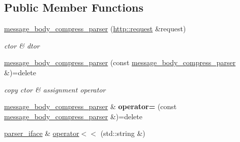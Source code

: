 \subsection*{Public Member Functions}
\begin{DoxyCompactItemize}
\item 
\mbox{\label{classnetflex_1_1parsing_1_1message__body__compress__parser_a6cd3e2a01694e42f973640fa144e58e1}} 
\hyperlink{classnetflex_1_1parsing_1_1message__body__compress__parser_a6cd3e2a01694e42f973640fa144e58e1}{message\+\_\+body\+\_\+compress\+\_\+parser} (\hyperlink{classnetflex_1_1http_1_1request}{http\+::request} \&request)
\begin{DoxyCompactList}\small\item\em ctor \& dtor \end{DoxyCompactList}\item 
\mbox{\label{classnetflex_1_1parsing_1_1message__body__compress__parser_a1d5e498f4b6ff6dfaaebc44a5548a429}} 
\hyperlink{classnetflex_1_1parsing_1_1message__body__compress__parser_a1d5e498f4b6ff6dfaaebc44a5548a429}{message\+\_\+body\+\_\+compress\+\_\+parser} (const \hyperlink{classnetflex_1_1parsing_1_1message__body__compress__parser}{message\+\_\+body\+\_\+compress\+\_\+parser} \&)=delete
\begin{DoxyCompactList}\small\item\em copy ctor \& assignment operator \end{DoxyCompactList}\item 
\mbox{\label{classnetflex_1_1parsing_1_1message__body__compress__parser_ab03ca2e5af5f21b934f020c661ad6ac1}} 
\hyperlink{classnetflex_1_1parsing_1_1message__body__compress__parser}{message\+\_\+body\+\_\+compress\+\_\+parser} \& {\bfseries operator=} (const \hyperlink{classnetflex_1_1parsing_1_1message__body__compress__parser}{message\+\_\+body\+\_\+compress\+\_\+parser} \&)=delete
\item 
\mbox{\label{classnetflex_1_1parsing_1_1message__body__compress__parser_a75fc64c9be07c57fd44028862933387b}} 
\hyperlink{classnetflex_1_1parsing_1_1parser__iface}{parser\+\_\+iface} \& \hyperlink{classnetflex_1_1parsing_1_1message__body__compress__parser_a75fc64c9be07c57fd44028862933387b}{operator$<$$<$} (std\+::string \&)

\end{DoxyCompactItemize}
